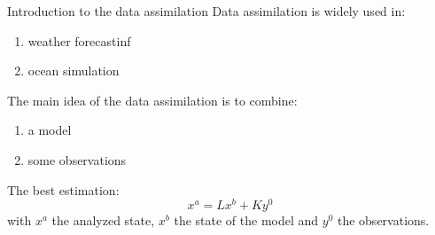 \begin{frame}{Introduction to the data assimilation}
 Data assimilation is widely used in:
 \begin{enumerate}[\textbullet]
		\item weather forecastinf
		\item ocean simulation
 \end{enumerate}	 
   	The main idea of the data assimilation is to combine:
 \begin{enumerate}[\textbullet]
		\item a model
		\item some observations
 \end{enumerate}	 
 The best estimation:
 $$x^a=Lx^b+Ky^0$$
 with $x^a$ the analyzed state, $x^b$ the state of the model and $y^0$ the observations.
\end{frame}
